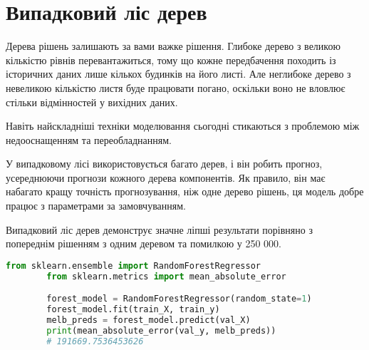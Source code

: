 \chapter{Випадковий ліс дерев}\label{cha:random_forest_tree}
Дерева рішень залишають за вами важке рішення.
Глибоке дерево з великою кількістю рівнів перевантажиться, тому що кожне передбачення походить із історичних даних лише кількох будинків на його листі.
Але неглибоке дерево з невеликою кількістю листя буде працювати погано, оскільки воно не вловлює стільки відмінностей у вихідних даних.

Навіть найскладніші техніки моделювання сьогодні стикаються з проблемою між недооснащенням та переобладнанням.

У випадковому лісі використовується багато дерев, і він робить прогноз, усереднюючи прогнози кожного дерева компонентів.
Як правило, він має набагато кращу точність прогнозування, ніж одне дерево рішень, ця модель добре працює з параметрами за замовчуванням.

Випадковий ліс дерев демонструє значне ліпші результати порівняно з попереднім рішенням з одним деревом та помилкою у 250 000.

\begin{lstlisting}[style=light, language=Python,label={lst:vectorimg},caption=Random Forest Tree]
        from sklearn.ensemble import RandomForestRegressor
        from sklearn.metrics import mean_absolute_error

        forest_model = RandomForestRegressor(random_state=1)
        forest_model.fit(train_X, train_y)
        melb_preds = forest_model.predict(val_X)
        print(mean_absolute_error(val_y, melb_preds))
        # 191669.7536453626
\end{lstlisting}
